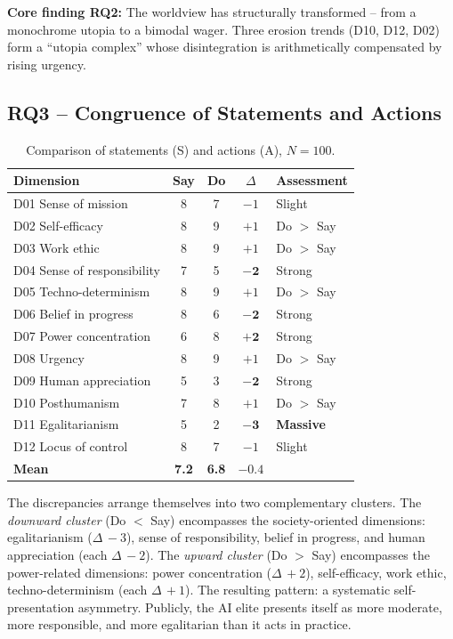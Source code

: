 \documentclass[12pt,a4paper]{article}
\begin{document}
\medskip
\noindent\textbf{Core finding RQ2:} The worldview has structurally transformed -- from a monochrome utopia to a bimodal wager. Three erosion trends (D10, D12, D02) form a ``utopia complex'' whose disintegration is arithmetically compensated by rising urgency.


\subsection{RQ3 -- Congruence of Statements and Actions}
\label{sec:ergebnisse:f3}

\begin{table}[htbp]
  \centering
  \caption{Comparison of statements (S) and actions (A), $N=100$.}
  \label{tab:kongruenz}
  \begin{tabular}{l c c c l}
    \toprule
    \textbf{Dimension} & \textbf{Say} & \textbf{Do} & $\Delta$ & \textbf{Assessment} \\
    \midrule
    D01 Sense of mission        & 8 & 7 & $-1$ & Slight \\
    D02 Self-efficacy           & 8 & 9 & $+1$ & Do $>$ Say \\
    D03 Work ethic              & 8 & 9 & $+1$ & Do $>$ Say \\
    D04 Sense of responsibility & 7 & 5 & $\mathbf{-2}$ & Strong \\
    D05 Techno-determinism      & 8 & 9 & $+1$ & Do $>$ Say \\
    D06 Belief in progress      & 8 & 6 & $\mathbf{-2}$ & Strong \\
    D07 Power concentration     & 6 & 8 & $\mathbf{+2}$ & Strong \\
    D08 Urgency                 & 8 & 9 & $+1$ & Do $>$ Say \\
    D09 Human appreciation      & 5 & 3 & $\mathbf{-2}$ & Strong \\
    D10 Posthumanism            & 7 & 8 & $+1$ & Do $>$ Say \\
    D11 Egalitarianism          & 5 & 2 & $\mathbf{-3}$ & \textbf{Massive} \\
    D12 Locus of control        & 8 & 7 & $-1$ & Slight \\
    \midrule
    \textbf{Mean}               & \textbf{7.2} & \textbf{6.8} & $-0.4$ & \\
    \bottomrule
  \end{tabular}
\end{table}

The discrepancies arrange themselves into two complementary clusters. The \emph{downward cluster} (Do $<$ Say) encompasses the society-oriented dimensions: egalitarianism ($\Delta\,-3$), sense of responsibility, belief in progress, and human appreciation (each $\Delta\,-2$). The \emph{upward cluster} (Do $>$ Say) encompasses the power-related dimensions: power concentration ($\Delta\,+2$), self-efficacy, work ethic, techno-determinism (each $\Delta\,+1$). The resulting pattern: a systematic self-presentation asymmetry. Publicly, the AI elite presents itself as more moderate, more responsible, and more egalitarian than it acts in practice.
\end{document}
